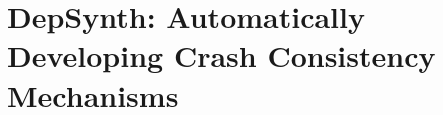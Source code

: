 %
\chapter{DepSynth: Automatically Developing Crash Consistency Mechanisms}
\label{c:depsynth}









% 









% 
